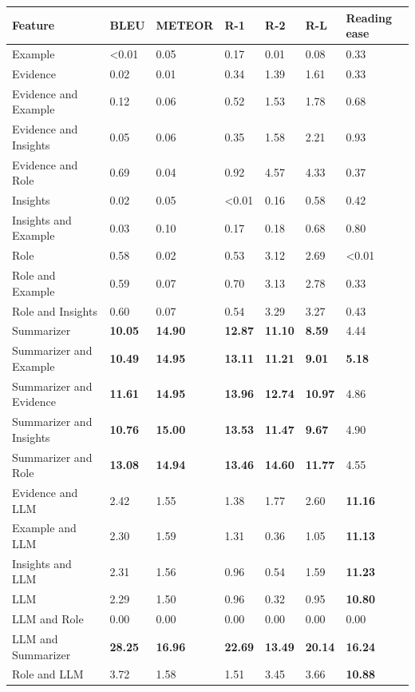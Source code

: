 \begin{tabular}{|l|l|l|l|l|l|l|}
\hline
\textbf{Feature} & BLEU & METEOR & R-1 & R-2 & R-L & Reading ease \\
 \hline
 Example & \textless{}0.01 & 0.05 & 0.17 & 0.01 & 0.08 & 0.33 \\
 \hline
 Evidence & 0.02 & 0.01 & 0.34 & 1.39 & 1.61 & 0.33 \\
 \hline
 Evidence and Example & 0.12 & 0.06 & 0.52 & 1.53 & 1.78 & 0.68 \\
 \hline
 Evidence and Insights & 0.05 & 0.06 & 0.35 & 1.58 & 2.21 & 0.93 \\
 \hline
 Evidence and Role & 0.69 & 0.04 & 0.92 & 4.57 & 4.33 & 0.37 \\
 \hline
 Insights & 0.02 & 0.05 & \textless{}0.01 & 0.16 & 0.58 & 0.42 \\
 \hline
 Insights and Example & 0.03 & 0.10 & 0.17 & 0.18 & 0.68 & 0.80 \\
 \hline
 Role & 0.58 & 0.02 & 0.53 & 3.12 & 2.69 & \textless{}0.01 \\
 \hline
 Role and Example & 0.59 & 0.07 & 0.70 & 3.13 & 2.78 & 0.33 \\
 \hline
 Role and Insights & 0.60 & 0.07 & 0.54 & 3.29 & 3.27 & 0.43 \\
 \hline
 Summarizer & \textbf{10.05} & \textbf{14.90} & \textbf{12.87} & \textbf{11.10} & \textbf{8.59} & 4.44 \\
 \hline
 Summarizer and Example & \textbf{10.49} & \textbf{14.95} & \textbf{13.11} & \textbf{11.21} & \textbf{9.01} & \textbf{5.18} \\
 \hline
 Summarizer and Evidence & \textbf{11.61} & \textbf{14.95} & \textbf{13.96} & \textbf{12.74} & \textbf{10.97} & 4.86 \\
 \hline
 Summarizer and Insights & \textbf{10.76} & \textbf{15.00} & \textbf{13.53} & \textbf{11.47} & \textbf{9.67} & 4.90 \\
 \hline
 Summarizer and Role & \textbf{13.08} & \textbf{14.94} & \textbf{13.46} & \textbf{14.60} & \textbf{11.77} & 4.55 \\
 \hline
 Evidence and LLM & 2.42 & 1.55 & 1.38 & 1.77 & 2.60 & \textbf{11.16} \\
 \hline
 Example and LLM & 2.30 & 1.59 & 1.31 & 0.36 & 1.05 & \textbf{11.13} \\
 \hline
 Insights and LLM & 2.31 & 1.56 & 0.96 & 0.54 & 1.59 & \textbf{11.23} \\
 \hline
 LLM & 2.29 & 1.50 & 0.96 & 0.32 & 0.95 & \textbf{10.80} \\
 \hline
 LLM and Role & 0.00 & 0.00 & 0.00 & 0.00 & 0.00 & 0.00 \\
 \hline
 LLM and Summarizer & \textbf{28.25} & \textbf{16.96} & \textbf{22.69} & \textbf{13.49} & \textbf{20.14} & \textbf{16.24} \\
 \hline
 Role and LLM & 3.72 & 1.58 & 1.51 & 3.45 & 3.66 & \textbf{10.88} \\
\hline
\end{tabular}
